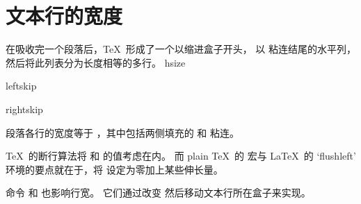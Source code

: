 \documentclass{book}
\begin{document}
\section{文本行的宽度}

在吸收完一个段落后，\TeX\ 形成了一个以缩进盒子开头，
以  粘连结尾的水平列，然后将此列表分为长度相等的多行。
\cstoidx hsize\par\cstoidx leftskip\par\cstoidx rightskip\par
段落各行的宽度等于 ，其中包括两侧填充的  和
 粘连。

\TeX\ 的断行算法将  和  的值考虑在内。
而 plain \TeX\ 的  宏与 \LaTeX\ 的 `flushleft'
环境的要点就在于，将  设定为零加上某些伸长量。

命令  和  也影响行宽。
它们通过改变  然后移动文本行所在盒子来实现。


\end{document}
